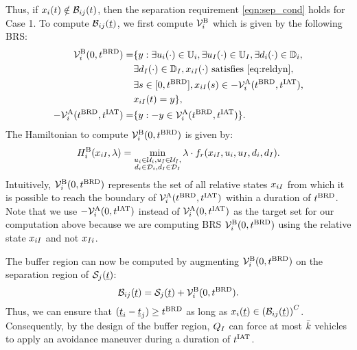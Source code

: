 Thus, if $x_i(t) \notin \mathcal{B}_{ij}(t)$, then the separation requirement \eqref{eqn:sep_cond} holds for Case 1. To compute $\mathcal{B}_{ij}(\underline{t})$, we first compute $\mathcal{V}^{\text{B}}_{i}$ which is given by the following BRS:
\begin{equation} \label{eqn:buffBRS_case1}
\begin{aligned}
\brs^{\text{B}}_{i}(0, \brd) = & \{y: \exists \ctrl_i(\cdot) \in \cfset_i, \exists \ctrl_\intr(\cdot) \in \cfset_\intr, \exists \dstb_i(\cdot) \in \dfset_i, \\
& \exists \dstb_\intr(\cdot) \in \dfset_\intr, \state_{i \intr}(\cdot) \text{ satisfies \eqref{eq:reldyn}},\\
& \exists s \in [0, \brd], \state_{i \intr}(s) \in -\brs^{\text{A}}_{i}(\brd, \iat),\\
& \state_{i \intr}(t) = y\},\\
-\brs^{\text{A}}_{i}(\brd, \iat) = & \{y: -y \in \brs^{\text{A}}_{i}(\brd, \iat) \}.
\end{aligned}
\end{equation}
The Hamiltonian to compute $\mathcal{V}^{\text{B}}_{i}(0, t^\text{BRD})$ is given by:
\begin{equation} 
H^{\text{B}}_{i}(x_{i I}, \lambda) = \min_{\substack{u_i \in \mathcal{U}_i, u_I \in \mathcal{U}_I, \\ d_i \in \mathcal{D}_i, d_I \in \mathcal{D}_I}} \lambda \cdot f_r(x_{i I}, u_i, u_I, d_i, d_I).
\end{equation}
Intuitively, $\mathcal{V}^{\text{B}}_{i}(0, t^\text{BRD})$ represents the set of all relative states $x_{i I}$ from which it is possible to reach the boundary of $\mathcal{V}^{\text{A}}_{i}(t^\text{BRD}, t^\text{IAT})$ within a duration of $t^\text{BRD}$. Note that we use $-\mathcal{V}^{\text{A}}_{i}(0, t^\text{IAT})$ instead of $\mathcal{V}^{\text{A}}_{i}(0, t^\text{IAT})$ as the target set for our computation above because we are computing BRS $\mathcal{V}^{\text{B}}_{i}(0, t^\text{BRD})$ using the relative state $x_{i I}$ and not $x_{I i}$.  %

The buffer region can now be computed by augmenting $\mathcal{V}^{\text{B}}_{i}(0, t^\text{BRD})$ on the separation region of $\mathcal{S}_j(\underline{t})$:
\begin{equation} \label{eqn:buffRegion_case1}
\buff_{ij}(\tsa) = \sep_j(\tsa) + \brs^{\text{B}}_{i}(0, \brd).
\end{equation} 
Thus, we can ensure that $(\underline{t}_i - \underline{t}_j) \geq t^\text{BRD}$ as long as $x_i(\underline{t}) \in \left(\mathcal{B}_{ij}(\underline{t})\right)^C$. Consequently, by the design of the buffer region, $Q_{I}$ can force at most $\bar{k}$ vehicles to apply an avoidance maneuver during a duration of $t^\text{IAT}$.
